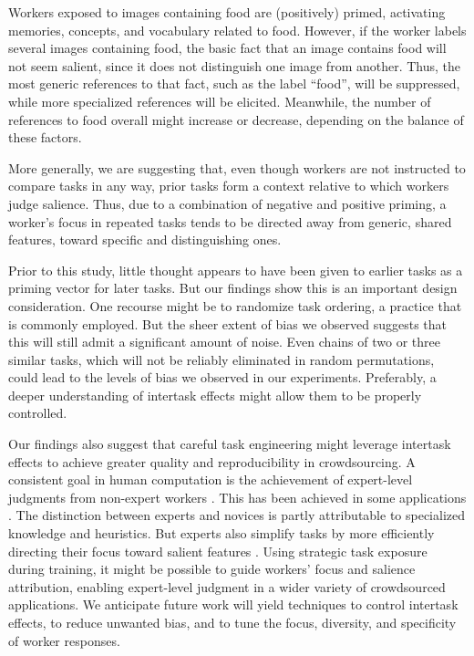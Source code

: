 \documentclass{sigchi}
\begin{document}
Workers exposed to images containing food are (positively) primed, 
activating memories, concepts, and vocabulary related to food.  
However, if the worker labels several images containing food, the basic 
fact that an image contains food will not seem salient, since it 
does not distinguish one image from another.  Thus, the most 
generic references to that fact, such as the label ``food'', 
will be suppressed, while more specialized references will be elicited.  
Meanwhile, the number of references to food overall might increase or 
decrease, depending on the balance of these factors.  

More generally, we are suggesting that, even though workers are not 
instructed to compare tasks in any way, prior tasks form a 
context relative to which workers judge salience.  Thus, due to a combination 
of negative and positive priming, a worker's focus 
in repeated tasks tends to be directed away from generic, shared features, 
toward specific and distinguishing ones.

Prior to this study, little thought appears to have been given to
earlier tasks as a priming vector for later tasks.
But our findings show this is an important design consideration.  
One recourse might be to randomize task ordering, a practice that is 
commonly employed.  But the sheer extent of bias we observed suggests that 
this will still admit a significant amount of noise.  
Even chains of two or three similar tasks, which
will not be reliably eliminated in random permutations, could lead
to the levels of bias we observed in our experiments.
Preferably, a deeper understanding of intertask effects might allow them
to be properly controlled.

Our findings also suggest that careful task engineering might leverage
intertask effects to achieve greater quality and reproducibility in 
crowdsourcing.
A consistent goal in human computation is the achievement of expert-level
judgments from non-expert workers \cite{kittur2011crowdforge}.  
This has been achieved in some
applications \cite{snow2008cheap,Mortensen20131020,Warby2014385}. 
The distinction between experts and novices is partly attributable
to specialized knowledge and heuristics. 
But experts also simplify tasks by more efficiently directing 
their focus toward salient features \cite{kellman2009perceptual}.  
Using strategic task exposure during training, 
it might be possible to guide workers' focus 
and salience attribution, enabling expert-level 
judgment in a wider variety of
crowdsourced applications.
We anticipate future work will yield techniques to control intertask 
effects, to reduce unwanted bias, and to tune the focus, diversity, and 
specificity of worker responses.
\end{document}
